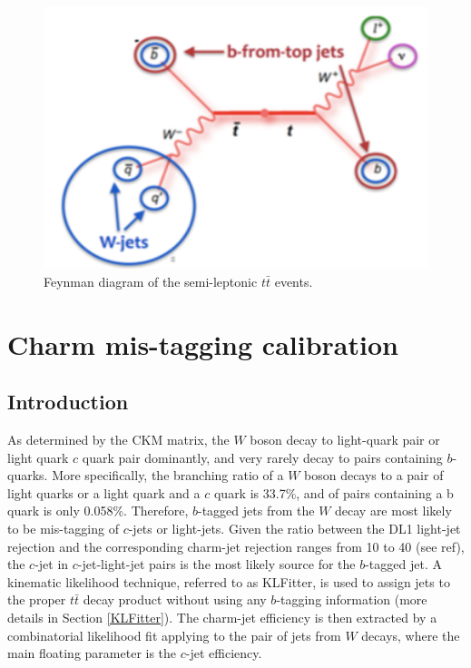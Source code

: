 \documentclass[letterpaper,12pt]{article}
\begin{document}
\begin{figure}[H]
\centering
\begin{minipage}[b]{.45\textwidth}
\centering
\includegraphics[width=1\textwidth]{feynman.png}
\end{minipage}
\caption{Feynman diagram of the semi-leptonic $t\bar{t}$ events.}
\label{fig:feynman}
\end{figure}
\section{Charm mis-tagging calibration}
\label{charm mistagging}
\subsection{Introduction}
As determined by the CKM matrix\cite{CKM1}\cite{CKM2}, the $W$ boson decay to light-quark pair or light quark $c$ quark pair dominantly, and very rarely decay to pairs containing $b$-quarks. More specifically, the branching ratio of a $W$ boson decays to a pair of light quarks or a light quark and a $c$ quark is 33.7\%, and of pairs containing a b quark is only 0.058\%\cite{PDG}. Therefore, $b$-tagged jets from the $W$ decay are most likely to be mis-tagging of $c$-jets or light-jets. Given the ratio between the DL1 light-jet rejection and the corresponding charm-jet rejection ranges from 10 to 40 (see ref\cite{ATL-PHYS-PUB-2017-013}), the $c$-jet in $c$-jet-light-jet pairs is the most likely source for the $b$-tagged jet. A kinematic likelihood technique, referred to as KLFitter\cite{ERDMANN201418}, is used to assign jets to the proper $t\bar{t}$ decay product without using any $b$-tagging information (more details in Section \ref{KLFitter}). The charm-jet efficiency is then extracted by a combinatorial likelihood fit applying to the pair of jets from $W$ decays, where the main floating parameter is the $c$-jet efficiency\cite{cjet}. 
\end{document}
